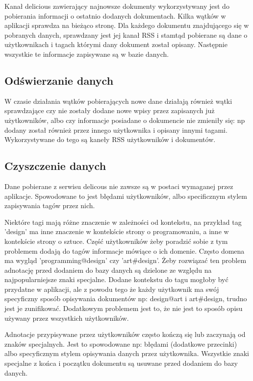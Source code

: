 Kanał delicious zawierający najnowsze dokumenty wykorzystywany jest do pobierania informacji o ostatnio dodanych dokumentach. Kilka wątków w aplikacji sprawdza na bieżąco stronę. Dla każdego dokumentu znajdującego się w pobranych danych, sprawdzany jest jej kanał RSS i stamtąd pobierane są dane o użytkownikach i tagach którymi dany dokument został opisany. Następnie wszystkie te informacje zapisywane są w bazie danych.

\subsection*{Odświerzanie danych}

W czasie działania wątków pobierających nowe dane działają również wątki sprawdzające czy nie zostały dodane nowe wpisy przez zapisanych już użytkowników, albo czy informacje posiadane o dokumencie nie zmieniły się: np dodany został również przez innego użytkownika i opisany innymi tagami. Wykorzystywane do tego są kaneły RSS użytkowników i dokumentów.

\subsection*{Czyszczenie danych}

Dane pobierane z serwisu delicous nie zawsze są w postaci wymaganej przez aplikacje. Spowodowane to jest błędami użytkowników, albo specificznym stylem zapisywania tagów przez nich.

Niektóre tagi mają różne znaczenie w zależności od kontekstu, na przykład tag 'design' ma inne znaczenie w kontekście strony o programowaniu, a inne w kontekście strony o sztuce. Część użytkowników żeby poradzić sobie  z tym problemem dodają do tagów informacje mówiące o ich domenie. Często domena ma wygląd 'programming@design' czy 'art\#design'. Żeby rozwiązać ten problem adnotację przed dodaniem do bazy danych są dzielone ze względu na najpopularniejsze znaki specjalne. Dodane kontekstu do tagu mogłoby być przydatne w aplikacji, ale z powodu tego że każdy użytkownik ma swój specyficzny sposób opisywania dokumentów np: design@art i art\#design, trudno jest je zunifikować. Dodatkowym problemem jest to, że nie jest to sposób opisu używany przez wszystkich użytkowników. 


Adnotacje przypisywane przez użytkowników często kończą się lub zaczynają od znaków specjalnych. Jest to spowodowane np: błędami (dodatkowe przecinki) albo specyficznym stylem opisywania danych przez użytkownika. Wszystkie znaki specjalne z końca i początku dokumentu są usuwane przed dodaniem do bazy danych.


